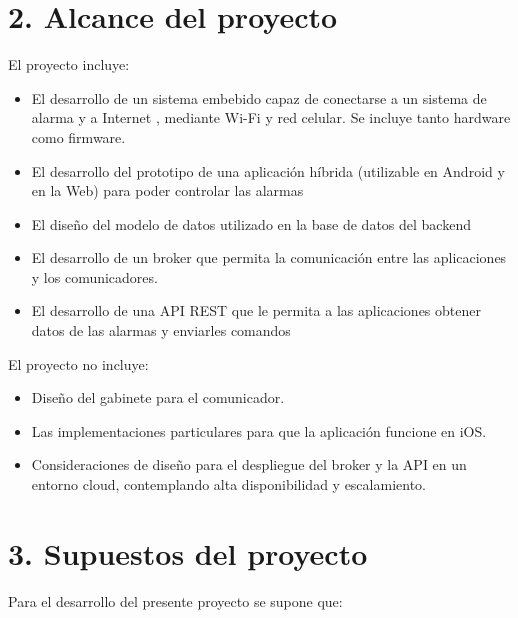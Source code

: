 \documentclass[
11pt, %
codirector, %
]{charter}
\begin{document}
\section{2. Alcance del proyecto}
\label{sec:alcance}


El proyecto incluye:

\begin{itemize}
	\item El desarrollo de un sistema embebido capaz de conectarse a un sistema de alarma y a Internet , mediante Wi-Fi y red celular. Se incluye tanto hardware como firmware.
	\item El desarrollo del prototipo de una aplicación híbrida (utilizable en Android y en la Web) para poder controlar las alarmas
	\item El diseño del modelo de datos utilizado en la base de datos del backend
	\item El desarrollo de un broker que permita la comunicación entre las aplicaciones y los comunicadores.
	\item El desarrollo de una API REST que le permita a las aplicaciones obtener datos de las alarmas y enviarles comandos
\end{itemize}

El proyecto no incluye:

\begin{itemize}
	\item Diseño del gabinete para el comunicador.
	\item Las implementaciones particulares para que la aplicación funcione en iOS.
	\item Consideraciones de diseño para el despliegue del broker y la API en un entorno cloud, contemplando alta disponibilidad y escalamiento.
\end{itemize}



\section{3. Supuestos del proyecto}
\label{sec:supuestos}

Para el desarrollo del presente proyecto se supone que:
\end{document}
